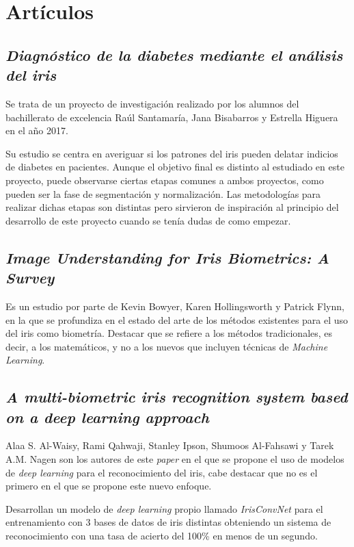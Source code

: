 
\section{Artículos}
\subsection{\emph{Diagnóstico de la diabetes mediante el análisis del iris}}
Se trata de un proyecto de investigación realizado por los alumnos del bachillerato de excelencia Raúl Santamaría, Jana Bisabarros y Estrella Higuera en el año 2017.

Su estudio se centra en averiguar si los patrones del iris pueden delatar indicios de diabetes en pacientes. Aunque el objetivo final es distinto al estudiado en este proyecto, puede observarse ciertas etapas comunes a ambos proyectos, como pueden ser la fase de segmentación y normalización. Las metodologías para realizar dichas etapas son distintas pero sirvieron de inspiración  al principio del desarrollo de este proyecto cuando se tenía dudas de como empezar.

\subsection{\emph{Image Understanding for Iris Biometrics: A Survey}}
Es un estudio por parte de Kevin Bowyer, Karen Hollingsworth y Patrick Flynn, en la que se profundiza en el estado del arte de los métodos existentes para el uso del iris como biometría. Destacar que se refiere a los métodos tradicionales, es decir, a los matemáticos, y no a los nuevos que incluyen técnicas de \emph{Machine Learning}.


\subsection{\emph{A multi-biometric iris recognition system based on a deep learning approach}}

Alaa S. Al-Waisy, Rami Qahwaji, Stanley Ipson, Shumoos Al-Fahsawi y Tarek A.M. Nagen son los autores de este \emph{paper} en el que se propone el uso de modelos de \emph{deep learning} para el reconocimiento del iris, cabe destacar que no es el primero en el que se propone este nuevo enfoque.

Desarrollan un modelo de \emph{deep learning} propio llamado \emph{IrisConvNet} para el entrenamiento con 3 bases de datos de iris distintas obteniendo un sistema de reconocimiento con una tasa de acierto del 100\% en menos de un segundo.

